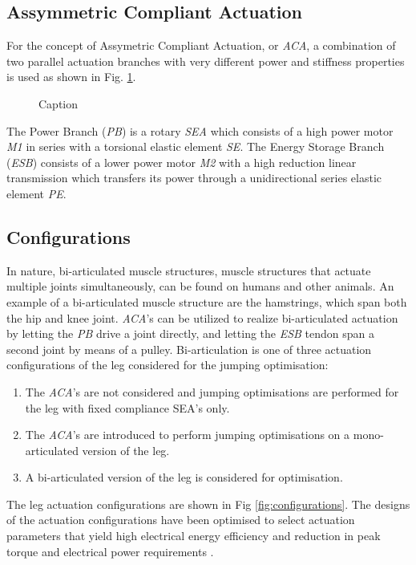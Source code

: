 \documentclass[letterpaper, 10 pt, conference]{ieeeconf}  %
\begin{document}
\subsection{Assymmetric Compliant Actuation}

For the concept of Assymetric Compliant Actuation, or \textit{ACA}, a combination of two parallel actuation branches with very different power and stiffness properties is used as shown in Fig. \ref{fig:ACA}.
\begin{figure}[b]
	\centering
	\caption{Caption}
	\label{fig:ACA}
\end{figure}
 The Power Branch (\textit{PB}) is a rotary \textit{SEA} which consists of a high power motor \textit{M1} in series with a torsional elastic element \textit{SE}. The Energy Storage Branch (\textit{ESB}) consists of a lower power motor \textit{M2} with a high reduction linear transmission which transfers its power through a unidirectional series elastic element \textit{PE}.

\subsection{Configurations}
In nature, bi-articulated muscle structures, muscle structures that actuate multiple joints simultaneously, can be found on humans and other animals. An example of a bi-articulated muscle structure are the hamstrings, which span both the hip and knee joint. \textit{ACA}'s can be utilized to realize bi-articulated actuation by letting the \textit{PB} drive a joint directly, and letting the \textit{ESB} tendon span a second joint by means of a pulley. Bi-articulation is one of three actuation configurations of the leg considered for the jumping optimisation:

  \begin{enumerate}
	\item The \textit{ACA}'s are not considered and jumping optimisations are performed for the leg with fixed compliance SEA's only.
	\item The \textit{ACA}'s are introduced to perform jumping optimisations on a mono-articulated version of the leg. 
	\item A bi-articulated version of the leg is considered for optimisation.
\end{enumerate}
The leg actuation configurations are shown in Fig \ref{fig:configurations}. The designs of the actuation configurations have been optimised to select actuation
parameters that yield high electrical energy efficiency and reduction in peak torque and electrical power requirements \cite{roozing2016design}.
\end{document}
